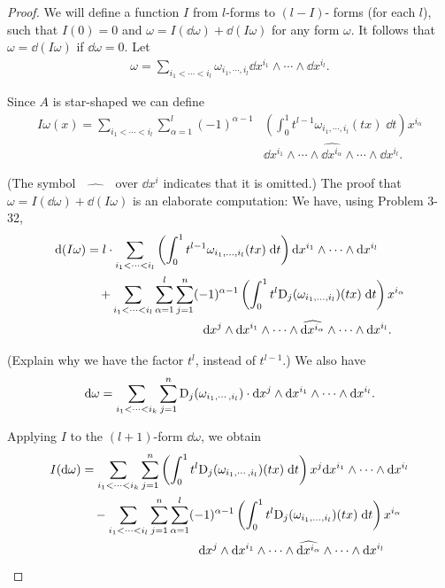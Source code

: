 \begin{proof}
  We will define a function $I$ from $l$-forms to $(l-I)$-
forms (for each $l$), such that $I(0) = 0$ and $\omega = I(\dd\omega) + \dd(I\omega)$
for any form $\omega$. It follows that $\omega = \dd(I\omega)$ if $\dd\omega = 0$. Let
\begin{align*}
  \omega = \sum_{i_1<\cdots<i_l}^{}{\omega_{i_1,\cdots,i_l}\dd x^{i_1}\wedge\cdots\wedge\dd x^{i_l}}.
\end{align*}

Since $A$ is star-shaped we can define 
\begin{align*}
  I\omega(x) = \sum_{i_1<\cdots<i_l}^{}
    \sum_{\alpha=1}^{l}(-1)^{\alpha-1} & \left(\int_0^1t^{l-1}\omega_{i_1,\cdots,i_l}(tx)\;\dd t\right)x^{i_\alpha}\\
    & \dd x^{i_1}\wedge\cdots\wedge\widehat{\dd x^{i_\alpha}}\wedge\cdots\wedge\dd x^{i_l}.
\end{align*}

(The symbol $\;\widehat{\qquad}\;$ over $\dd x^i$ indicates that it is omitted.) 
The proof that $\omega = I(\dd \omega) + \dd(I\omega)$
is an elaborate computation: We have, using Problem 3-32,
\begin{align*}
  \mathrm{d} (I\omega)
  & = l\cdot\sum_{i_1<\cdots<i_l}\left(\int_0^1t^{l-1}\omega_{i_1,\ldots,i_l}(tx)\;\mathrm{d} t\right)\mathrm{d} x^{i_1}\wedge\cdots\wedge\mathrm{d} x^{i_l} \\
  & \hspace*{1em} + \sum_{i_1<\cdots<i_l}\sum_{{\alpha}=1}^l\sum_{j=1}^n (-1)^{{\alpha}-1}\left(\int_0^1t^l\mathrm{D}_j(\omega_{i_1,\ldots,i_l})(tx)\;\mathrm{d} t\right)x^{i_\alpha} \\
  & \hspace*{9.5em} \mathrm{d} x^j\wedge \mathrm{d} x^{i_1}\wedge\cdots\wedge\widehat{\mathrm{d} x^{i_{\alpha}}}\wedge\cdots\wedge \mathrm{d} x^{i_{l}}.
\end{align*}

(Explain why we have the factor $t^l$, instead of $t^{l-1}$.) We also have
\begin{align*}
    \mathrm{d}\omega
    = \sum_{i_1<\cdots<i_k}^{}{\sum_{j=1}^{n}{\mathrm{D}_j(\omega_{i_1,\cdots,i_l})\cdot \mathrm{d} x^j\wedge\mathrm{d} x^{i_1}\wedge\cdots\wedge\mathrm{d} x^{i_l}}}.
\end{align*}

Applying $I$ to the $(l+1)$-form $\dd \omega$, we obtain
\begin{align*}
    I(\mathrm{d} \omega)
    & = \sum_{i_1<\cdots<i_k}^{}\sum_{j=1}^{n}\left(\int_0^1t^l\mathrm{D}_j(\omega_{i_1,\cdots,i_l})(tx)\;\mathrm{d} t\right) x^j \mathrm{d} x^{i_1}\wedge\cdots\wedge\mathrm{d} x^{i_l} \\
    & \hspace*{1em} - \sum_{i_1<\cdots<i_l}\sum_{{j}=1}^n\sum_{\alpha=1}^l (-1)^{{\alpha}-1}\left(\int_0^1t^l\mathrm{D}_j(\omega_{i_1,\ldots,i_l})(tx)\;\mathrm{d} t\right)x^{i_\alpha} \\
    & \hspace*{9.5em} \mathrm{d} x^j\wedge \mathrm{d} x^{i_1}\wedge\cdots\wedge\widehat{\mathrm{d} x^{i_{\alpha}}}\wedge\cdots\wedge \mathrm{d} x^{i_{l}}
\end{align*}


\end{proof}
